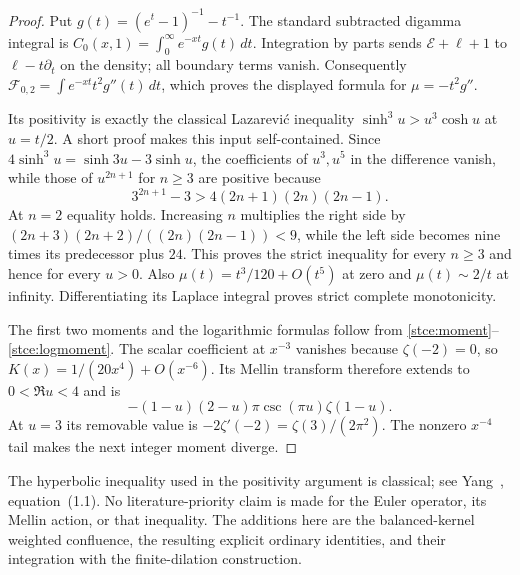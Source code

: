 \begin{proof}
Put $g(t)=(e^t-1)^{-1}-t^{-1}$.  The standard subtracted digamma
integral is $C_0(x,1)=\int_0^\infty e^{-xt}g(t)\,dt$.
Integration by parts sends $\mathcal E+\ell+1$ to
$\ell-t\partial_t$ on the density; all boundary terms vanish.
Consequently $\mathcal F_{0,2}=\int e^{-xt}t^2g''(t)\,dt$,
which proves the displayed formula for $\mu=-t^2g''$.

Its positivity is exactly the classical Lazarevi\'c inequality
$\sinh^3u>u^3\cosh u$ at $u=t/2$.  A short proof makes this input
self-contained.  Since $4\sinh^3u=\sinh3u-3\sinh u$, the coefficients
of $u^3,u^5$ in the difference vanish, while those of $u^{2n+1}$
for $n\ge3$ are positive because
\[
 3^{2n+1}-3>4(2n+1)(2n)(2n-1).
\]
At $n=2$ equality holds.  Increasing $n$ multiplies the right side
by $(2n+3)(2n+2)/((2n)(2n-1))<9$, while the left side becomes
nine times its predecessor plus $24$.  This proves the strict
inequality for every $n\ge3$ and hence for every $u>0$.
Also $\mu(t)=t^3/120+O(t^5)$ at zero and $\mu(t)\sim2/t$ at infinity.
Differentiating its Laplace integral proves strict complete monotonicity.

The first two moments and the logarithmic formulas follow from
\eqref{stce:moment}--\eqref{stce:logmoment}.  The scalar coefficient at
$x^{-3}$ vanishes because $\zeta(-2)=0$, so $K(x)=1/(20x^4)+O(x^{-6})$.
Its Mellin transform therefore extends to $0<\Re u<4$ and is
\[
 -(1-u)(2-u)\pi\csc(\pi u)\zeta(1-u).
\]
At $u=3$ its removable value is $-2\zeta'(-2)=\zeta(3)/(2\pi^2)$.
The nonzero $x^{-4}$ tail makes the next integer moment diverge.
\end{proof}

The hyperbolic inequality used in the positivity argument is classical;
see Yang~\cite{stce:Lazarevic}, equation~(1.1).
No literature-priority claim is made for the Euler operator, its Mellin
action, or that inequality. The additions here are the balanced-kernel
weighted confluence, the resulting explicit ordinary identities, and
their integration with the finite-dilation construction.

